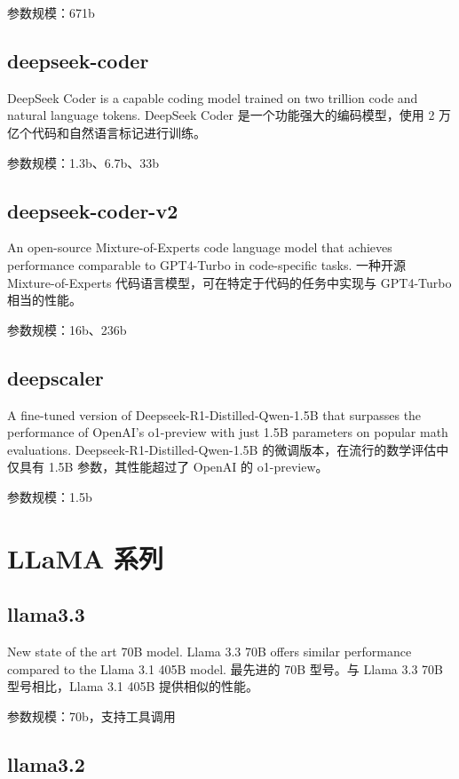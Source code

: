 \documentclass[12pt,UTF8]{ctexbook}
\begin{document}
参数规模：671b

\subsection{deepseek-coder}

DeepSeek Coder is a capable coding model trained on two trillion code and natural language tokens.
DeepSeek Coder 是一个功能强大的编码模型，使用 2 万亿个代码和自然语言标记进行训练。

参数规模：1.3b、6.7b、33b

\subsection{deepseek-coder-v2}

An open-source Mixture-of-Experts code language model that achieves performance comparable to GPT4-Turbo in code-specific tasks.
一种开源 Mixture-of-Experts 代码语言模型，可在特定于代码的任务中实现与 GPT4-Turbo 相当的性能。

参数规模：16b、236b

\subsection{deepscaler}

A fine-tuned version of Deepseek-R1-Distilled-Qwen-1.5B that surpasses the performance of OpenAI's o1-preview with just 1.5B parameters on popular math evaluations.
Deepseek-R1-Distilled-Qwen-1.5B 的微调版本，在流行的数学评估中仅具有 1.5B 参数，其性能超过了 OpenAI 的 o1-preview。

参数规模：1.5b

\section{LLaMA 系列}

\subsection{llama3.3}

New state of the art 70B model. Llama 3.3 70B offers similar performance compared to the Llama 3.1 405B model.
最先进的 70B 型号。与 Llama 3.3 70B 型号相比，Llama 3.1 405B 提供相似的性能。

参数规模：70b，支持工具调用

\subsection{llama3.2}
\end{document}
